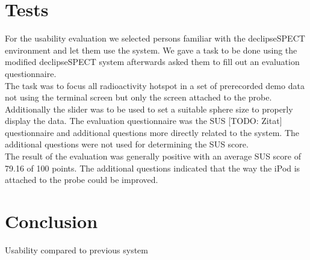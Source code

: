\documentclass{scrartcl}
\begin{document}
\section{Tests}
%
For the usability evaluation we selected persons familiar with the declipseSPECT environment and let them use the system. We gave a task to be done using the modified declipseSPECT system afterwards asked them to fill out an evaluation questionnaire.\\
The task was to focus all radioactivity hotspot in a set of prerecorded demo data not using the terminal screen but only the screen attached to the probe. Additionally the slider was to be used to set a suitable sphere size to properly display the data. The evaluation questionnaire was the SUS [TODO: Zitat] questionnaire and additional questions more directly related to the system. The additional questions were not used for determining the SUS score.\\
The result of the evaluation was generally positive with an average SUS score of 79.16 of 100 points. The additional questions indicated that the way the iPod is attached to the probe could be improved.


\section{Conclusion}
Usability compared to previous system\\



\end{document}
